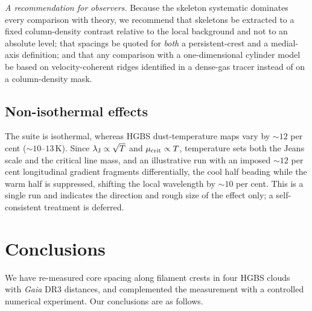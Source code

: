 \documentclass[usenatbib,twoside,twocolumn]{mnras}
\begin{document}
\smallskip\noindent\emph{A recommendation for observers.} Because the skeleton systematic dominates every comparison with theory, we recommend that skeletons be extracted to a fixed column-density contrast relative to the local background and not to an absolute level; that spacings be quoted for \emph{both} a persistent-crest and a medial-axis definition; and that any comparison with a one-dimensional cylinder model be based on velocity-coherent ridges identified in a dense-gas tracer instead of on a column-density mask.



\subsection{Non-isothermal effects}
\label{sec:mt_variation}

The suite is isothermal, whereas HGBS dust-temperature maps vary by $\sim12$ per cent ($\sim10$--$13$\,K). Since $\lambda_{\rm J}\propto\sqrt{T}$ and $\mu_{\rm crit}\propto T$, temperature sets both the Jeans scale and the critical line mass, and an illustrative run with an imposed $\sim12$ per cent longitudinal gradient fragments differentially, the cool half beading while the warm half is suppressed, shifting the local wavelength by $\sim10$ per cent. This is a single run and indicates the direction and rough size of the effect only; a self-consistent treatment is deferred.



\section{Conclusions}

We have re-measured core spacing along filament crests in four HGBS clouds with \textit{Gaia} DR3 distances, and complemented the measurement with a controlled numerical experiment. Our conclusions are as follows.
\end{document}
